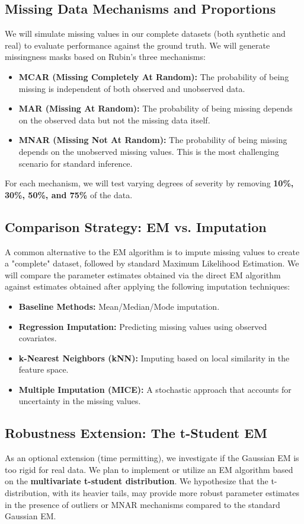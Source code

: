 \documentclass{article}
\begin{document}
\subsection{Missing Data Mechanisms and Proportions}
We will simulate missing values in our complete datasets (both synthetic and real) to evaluate performance against the ground truth. We will generate missingness masks based on Rubin’s three mechanisms:
\begin{itemize}
    \item \textbf{MCAR (Missing Completely At Random):} The probability of being missing is independent of both observed and unobserved data.
    \item \textbf{MAR (Missing At Random):} The probability of being missing depends on the observed data but not the missing data itself.
    \item \textbf{MNAR (Missing Not At Random):} The probability of being missing depends on the unobserved missing values. This is the most challenging scenario for standard inference.
\end{itemize}

For each mechanism, we will test varying degrees of severity by removing \textbf{10\%, 30\%, 50\%, and 75\%} of the data.

\subsection{Comparison Strategy: EM vs. Imputation}
A common alternative to the EM algorithm is to impute missing values to create a "complete" dataset, followed by standard Maximum Likelihood Estimation. We will compare the parameter estimates obtained via the direct EM algorithm against estimates obtained after applying the following imputation techniques:

\begin{itemize}
    \item \textbf{Baseline Methods:} Mean/Median/Mode imputation.
    \item \textbf{Regression Imputation:} Predicting missing values using observed covariates.
    \item \textbf{k-Nearest Neighbors (kNN):} Imputing based on local similarity in the feature space.
    \item \textbf{Multiple Imputation (MICE):} A stochastic approach that accounts for uncertainty in the missing values.
\end{itemize}

\subsection{Robustness Extension: The t-Student EM}
As an optional extension (time permitting), we investigate if the Gaussian EM is too rigid for real data. We plan to implement or utilize an EM algorithm based on the \textbf{multivariate t-student distribution}. We hypothesize that the t-distribution, with its heavier tails, may provide more robust parameter estimates in the presence of outliers or MNAR mechanisms compared to the standard Gaussian EM.
\end{document}
